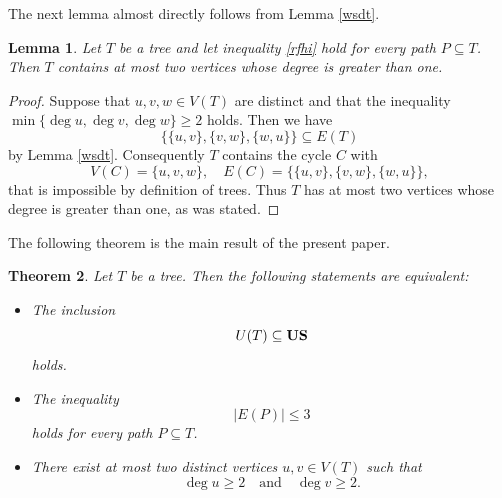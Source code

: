 \documentclass[11pt]{article}
\newtheorem{theorem}{Theorem}[section]
\newtheorem{lemma}[theorem]{Lemma}
\theoremstyle{definition}
\theoremstyle{remark}
\numberwithin{equation}{section}
\begin{document}
The next lemma almost directly follows from Lemma \ref{wsdt}.

\begin{lemma}\label{etyg}
Let \( T \) be a tree and let inequality \eqref{rfhi}
hold for every path $P\subseteq T$.  Then $T$ contains at most two vertices whose degree is greater than one.
\end{lemma}

\begin{proof}
    
Suppose that $u, v, w \in V(T)$ are distinct and that the inequality
$
\min\{\deg u, \deg v, \deg w\} \geq 2
$
holds. Then we have 
\begin{equation*}
\{\{u, v\}, \{v, w\},\{w, u\}\} \subseteq E(T)
\end{equation*}
by Lemma \ref{wsdt}.
Consequently $T$ contains the cycle $C$ with
\[
V(C) = \{u, v, w\}, \quad E(C) = \{\{u, v\}, \{v, w\}, \{w, u\}\},
\]
that is impossible by definition of trees. Thus $T$ has at most two vertices whose degree is greater than one, as was stated. 

\end{proof}


The following theorem is the main result of the present paper. 


\begin{theorem}\label{sun}
Let $T$ be a tree.  
Then the following statements are equivalent:  

\begin{itemize}[left=10pt]
    \item[(i)] The inclusion  
    \begin{equation}
        \label{div1}
        U(T) \subseteq {\bf US}
       \end{equation}
    holds.   

    \item[(ii)] The inequality  
    \[
        |E(P)| \leq 3
    \]
    holds for every path $P \subseteq T$.  

    \item[(iii)] There exist at most two distinct vertices $u, v \in V(T)$ such that  
    \begin{equation}
        \label{fer1}
        \deg u \geq 2 \quad \text{and} \quad \deg v \geq 2.
        \end{equation}
\end{itemize}
\end{theorem} 
\end{document}
